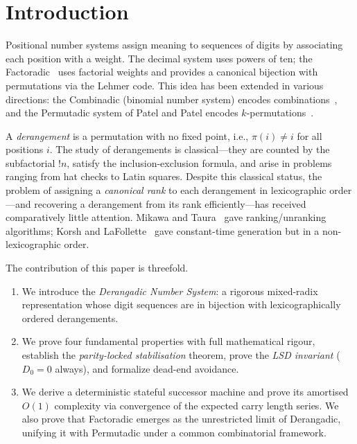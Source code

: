 \documentclass[11pt,a4paper]{article}
\newcommand{\subfact}[1]{!{#1}} %
\begin{document}
    \tableofcontents

    \newpage

    \section{Introduction}
    \label{sec:intro}

    Positional number systems assign meaning to sequences of digits by
    associating each position with a weight. The decimal system uses powers
    of ten; the Factoradic~\cite{lehmer1960} uses factorial weights and
    provides a canonical bijection with permutations via the Lehmer code.
    This idea has been extended in various directions: the Combinadic
    (binomial number system) encodes combinations~\cite{knuth2011taocp},
    and the Permutadic system of Patel and Patel encodes $k$-permutations~\cite{permutadic}.

    A \emph{derangement} is a permutation with no fixed point, i.e.,
    $\pi(i) \neq i$ for all positions $i$. The study of derangements is
    classical---they are counted by the subfactorial $\subfact{n}$, satisfy
    the inclusion-exclusion formula, and arise in problems ranging from hat
    checks to Latin squares. Despite this classical status, the problem of
    assigning a \emph{canonical rank} to each derangement in lexicographic
    order---and recovering a derangement from its rank efficiently---has
    received comparatively little attention. Mikawa and Taura~\cite{mikawa2014}
    gave ranking/unranking algorithms; Korsh and LaFollette~\cite{korsh2004}
    gave constant-time generation but in a non-lexicographic order.

    The contribution of this paper is threefold.

    \begin{enumerate}[leftmargin=1.5em]
  \item We introduce the \emph{Derangadic Number System}: a rigorous
  mixed-radix representation whose digit sequences are in bijection
  with lexicographically ordered derangements.
  \item We prove four fundamental properties with full mathematical rigour,
  establish the \emph{parity-locked stabilisation} theorem, prove the
  \emph{LSD invariant} ($D_0=0$ always), and formalize dead-end avoidance.
  \item We derive a deterministic stateful successor machine and prove its
  amortised $O(1)$ complexity via convergence of the expected carry
  length series. We also prove that Factoradic emerges as the unrestricted
  limit of Derangadic, unifying it with Permutadic under a common
  combinatorial framework.
    \end{enumerate}
\end{document}
